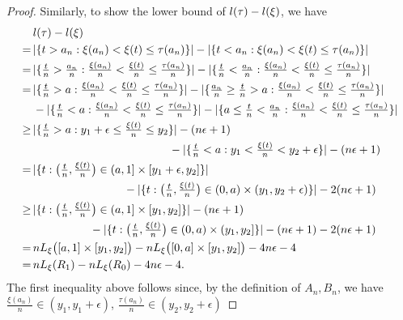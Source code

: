 \begin{proof}
Similarly, to show the lower bound of $l(\tau) - l(\xi)$, we have
\begin{align*}
  &l(\tau) - l(\xi)\\
 =\,&\textstyle|\{t > a_n : \xi(a_n) < \xi(t) \le \tau(a_n)\}| - |\{t < a_n : \xi(a_n) < \xi(t) \le \tau(a_n)\}|\\
 =\,&\textstyle|\{\frac{t}{n} > \frac{a_n}{n} : \frac{\xi(a_n)}{n} < \frac{\xi(t)}{n} \le \frac{\tau(a_n)}{n} \}|
    - |\{\frac{t}{n} < \frac{a_n}{n} : \frac{\xi(a_n)}{n} < \frac{\xi(t)}{n} \le \frac{\tau(a_n)}{n} \}|\\
 =\, &\textstyle|\{\frac{t}{n} > a : \frac{\xi(a_n)}{n} < \frac{\xi(t)}{n} \le \frac{\tau(a_n)}{n} \}|
    - |\{ \frac{a_n}{n} \ge \frac{t}{n} > a : \frac{\xi(a_n)}{n} < \frac{\xi(t)}{n} \le \frac{\tau(a_n)}{n} \}|\\
 &\textstyle - |\{\frac{t}{n} < a : \frac{\xi(a_n)}{n} < \frac{\xi(t)}{n} \le \frac{\tau(a_n)}{n} \}|
     - |\{a \le \frac{t}{n} < \frac{a_n}{n} : \frac{\xi(a_n)}{n} < \frac{\xi(t)}{n} \le \frac{\tau(a_n)}{n} \}|\\
 \ge\,&\textstyle|\{\frac{t}{n} > a : y_1 + \epsilon \le \frac{\xi(t)}{n} \le y_2 \}| - (n \epsilon +1)\\
        &\textstyle\qquad\qquad\qquad\qquad\qquad\qquad - |\{\frac{t}{n} < a : y_1 < \frac{\xi(t)}{n} < y_2 + \epsilon \}|- (n \epsilon +1)\\
 =\, &\textstyle|\{t : \big(\frac{t}{n}, \frac{\xi(t)}{n}\big) \in (a, 1] \times [y_1 + \epsilon, y_2]\}|\\
     &\textstyle\qquad\qquad\qquad\qquad - |\{t : \big(\frac{t}{n}, \frac{\xi(t)}{n}\big) \in (0, a) \times (y_1, y_2 + \epsilon) \}|
       - 2(n \epsilon +1)\\
 \ge\,&\textstyle|\{t : \big(\frac{t}{n}, \frac{\xi(t)}{n}\big) \in (a, 1] \times [y_1, y_2]\}| - (n\epsilon+1)\\
     &\textstyle\qquad\qquad\quad - |\{t : \big(\frac{t}{n}, \frac{\xi(t)}{n}\big) \in (0, a) \times (y_1, y_2] \}| - (n\epsilon+1)
       - 2(n \epsilon +1)\\
 =\, &\textstyle nL_{\xi}\big([a, 1] \times[y_1, y_2] \big) - nL_{\xi}\big([0, a] \times[y_1, y_2]\big) - 4n\epsilon -4\\
 =\, &\textstyle nL_{\xi}(R_1 ) - nL_{\xi}( R_0 ) - 4n\epsilon -4.
\end{align*}
The first inequality above follows since, by the definition of $A_n, B_n$, we have $\frac{\xi(a_n)}{n} \in (y_1, y_1 + \epsilon)$, $\frac{\tau(a_n)}{n} \in (y_2, y_2 + \epsilon)$

\end{proof}
